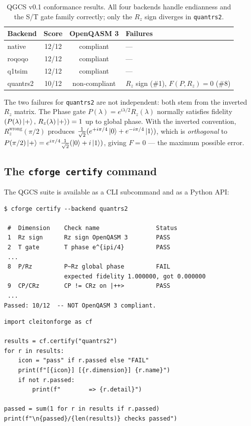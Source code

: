\documentclass[11pt,a4paper]{article}
\begin{document}
\begin{table}[h!]
\centering
\caption{QGCS v0.1 conformance results. All four backends handle endianness
         and the S/T gate family correctly; only the $R_z$ sign diverges in
         \texttt{quantrs2}.}
\label{tab:qgcs-results}
\begin{tabular}{lccl}
\toprule
Backend      & Score & OpenQASM 3 & Failures \\
\midrule
native       & 12/12 & compliant  & --- \\
roqoqo       & 12/12 & compliant  & --- \\
q1tsim       & 12/12 & compliant  & --- \\
quantrs2     & 10/12 & non-compliant & $R_z$ sign (\#1), $F(P, R_z)=0$ (\#8) \\
\bottomrule
\end{tabular}
\end{table}

The two failures for \texttt{quantrs2} are not independent: both stem from
the inverted $R_z$ matrix. The Phase gate $P(\lambda) = e^{i\lambda/2} R_z(\lambda)$
normally satisfies fidelity$(P(\lambda)\ket{+},\, R_z(\lambda)\ket{+}) = 1$ up to global
phase. With the inverted convention, $R_z^{\mathrm{wrong}}(\pi/2)$ produces
$\frac{1}{\sqrt{2}}(e^{+i\pi/4}\ket{0} + e^{-i\pi/4}\ket{1})$, which is
\emph{orthogonal} to $P(\pi/2)\ket{+} = e^{i\pi/4}\frac{1}{\sqrt{2}}(\ket{0}
+ i\ket{1})$, giving $F = 0$ --- the maximum possible error.

\subsection{The \texttt{cforge certify} command}

The QGCS suite is available as a CLI subcommand and as a Python API:

\begin{lstlisting}[style=rust, caption={\texttt{cforge certify} output for \texttt{quantrs2} (abbreviated).}]
$ cforge certify --backend quantrs2

 #  Dimension    Check name                Status
 1  Rz sign      Rz sign OpenQASM 3        PASS
 2  T gate       T phase e^{ipi/4}         PASS
 ...
 8  P/Rz         P~Rz global phase         FAIL
                 expected fidelity 1.000000, got 0.000000
 9  CP/CRz       CP != CRz on |++>         PASS
 ...
Passed: 10/12  -- NOT OpenQASM 3 compliant.
\end{lstlisting}

\begin{lstlisting}[style=python, caption={Python API for QGCS conformance checking.}]
import cleitonforge as cf

results = cf.certify("quantrs2")
for r in results:
    icon = "pass" if r.passed else "FAIL"
    print(f"[{icon}] [{r.dimension}] {r.name}")
    if not r.passed:
        print(f"        => {r.detail}")

passed = sum(1 for r in results if r.passed)
print(f"\n{passed}/{len(results)} checks passed")
\end{lstlisting}
\end{document}
